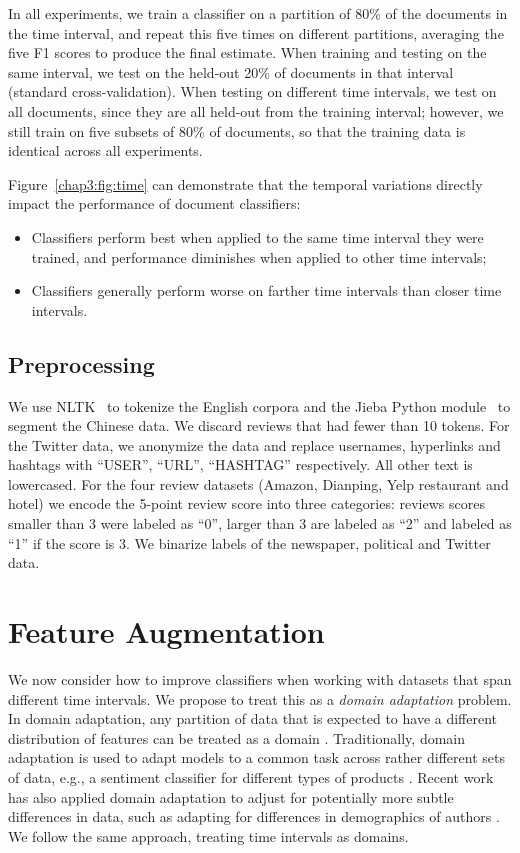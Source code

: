 In all experiments, we train a classifier on a partition of 80\% of the documents in the time interval, and repeat this five times on different partitions, averaging the five F1 scores to produce the final estimate. When training and testing on the same interval, we test on the held-out 20\% of documents in that interval (standard cross-validation).
When testing on different time intervals, we test on all documents, since they are all held-out from the training interval; however, we still train on five subsets of 80\% of documents, so that the training data is identical across all experiments.

Figure~\ref{chap3:fig:time} can demonstrate that the temporal variations directly impact the performance of document classifiers: 
\begin{itemize}
    \item Classifiers perform best when applied to the same time interval they were trained, and performance diminishes when applied to other time intervals;
    \item Classifiers generally perform worse on farther time intervals than closer time intervals.
\end{itemize}

\subsection{Preprocessing}
We use NLTK~\cite{bird2004nltk} to tokenize the English corpora and the Jieba Python module~\cite{sun2012jieba} to segment the Chinese data. 
We discard reviews that had fewer than 10 tokens. 
For the Twitter data, we anonymize the data and replace usernames, hyperlinks and hashtags with ``USER'', ``URL'', ``HASHTAG'' respectively. 
All other text is lowercased.
For the four review datasets (Amazon, Dianping, Yelp restaurant and hotel) we encode the 5-point review score into three categories: reviews scores smaller than 3 were labeled as ``0'', larger than 3 are labeled as ``2'' and labeled as ``1'' if the score is 3. We binarize labels of the newspaper, political and Twitter data. 


\section{Feature Augmentation}
\label{chap3:sec:fa}

We now consider how to improve classifiers when working with datasets that span different time intervals.
We propose to treat this as a {\em domain adaptation} problem.
In domain adaptation, any partition of data that is expected to have a different distribution of features can be treated as a domain \cite{joshi2013s}.
Traditionally, domain adaptation is used to adapt models to a common task across rather different sets of data, e.g., a sentiment classifier for different types of products \cite{blitzer2007biographies}.
Recent work has also applied domain adaptation to adjust for potentially more subtle differences in data, such as adapting for differences in demographics of authors \cite{volkova2013exploring, lynn2017human}.
We follow the same approach, treating time intervals as domains.

